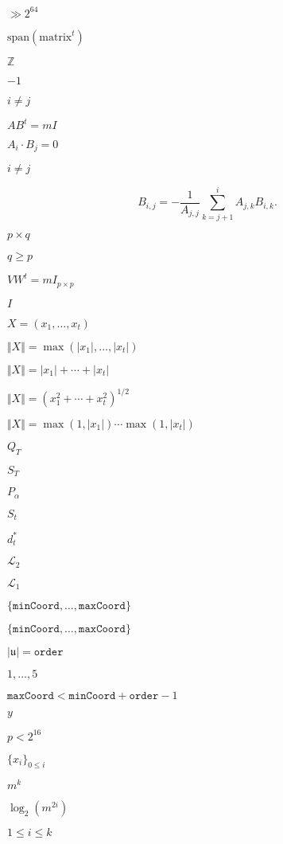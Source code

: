 \documentclass{article}
\begin{document}
$\gg 2^{64}$
\pagebreak

$\text{span}(\text{matrix}^t)$
\pagebreak

$\mathbb{Z}$
\pagebreak

$-1$
\pagebreak

$i \neq j$
\pagebreak

$AB^t = mI$
\pagebreak

$ A_i \cdot B_j = 0$
\pagebreak

$i\neq j$
\pagebreak

\[B_{i,j} = -\frac{1}{A_{j,j}}\sum_{k=j+1}^i A_{j,k} B_{i,k}.\]
\pagebreak

$p\times q$
\pagebreak

$q \geq p$
\pagebreak

$VW^t = mI_{p\times p}$
\pagebreak

$I$
\pagebreak

$X =
(x_1,…,x_t)$
\pagebreak

$\Vert X\Vert= \max(|x_1|,…,|x_t|)$
\pagebreak

$\Vert X\Vert= |x_1|+\cdots+|x_t|$
\pagebreak

$\Vert X\Vert= (x_1^2+\cdots+x_t^2)^{1/2}$
\pagebreak

$\Vert X\Vert= \max(1, |x_1|)\cdots\max(1, |x_t|)$
\pagebreak

$Q_T$
\pagebreak

$S_T$
\pagebreak

$P_{\alpha}$
\pagebreak

$S_t$
\pagebreak

$d_t^*$
\pagebreak

${\mathcal{L}}_2$
\pagebreak

${\mathcal{L}}_1$
\pagebreak

$\{\mathtt{minCoord}, \dots, \mathtt{maxCoord}\}$
\pagebreak

$\{\mathtt{minCoord}, \dots,
\mathtt{maxCoord}\}$
\pagebreak

$|\mathfrak u| = \mathtt{order}$
\pagebreak

$1, \dots, 5$
\pagebreak

$\mathtt{maxCoord} < \mathtt{minCoord} + \mathtt{order} - 1$
\pagebreak

$y$
\pagebreak

$p < 2^{16}$
\pagebreak

$\{x_i\}_{ 0 \leq i}$
\pagebreak

$m^k$
\pagebreak

$ \log_2(m^{2i}) $
\pagebreak

$ 1 \leq i \leq k $
\pagebreak
\end{document}
